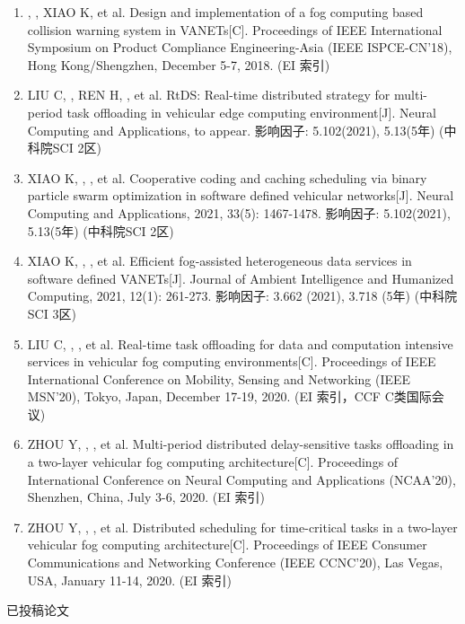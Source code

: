 \begin{enumerate}
	\item \textbf{}, , XIAO K, et al. Design and implementation of a fog computing based collision warning system in VANETs[C]. Proceedings of IEEE International Symposium on Product Compliance Engineering-Asia (IEEE ISPCE-CN’18), Hong Kong/Shengzhen, December 5-7, 2018. (EI 索引)
	\item LIU C, , REN H, \textbf{}, et al. RtDS: Real-time distributed strategy for multi-period task offloading in vehicular edge computing environment[J]. Neural Computing and Applications, to appear. 影响因子: 5.102(2021), 5.13(5年) (中科院SCI 2区)
	\item XIAO K, , \textbf{}, et al. Cooperative coding and caching scheduling via binary particle swarm optimization in software defined vehicular networks[J]. Neural Computing and Applications, 2021, 33(5): 1467-1478. 影响因子: 5.102(2021), 5.13(5年) (中科院SCI 2区)
	\item XIAO K, , \textbf{}, et al. Efficient fog-assisted heterogeneous data services in software defined VANETs[J]. Journal of Ambient Intelligence and Humanized Computing, 2021, 12(1): 261-273. 影响因子: 3.662 (2021), 3.718 (5年) (中科院SCI 3区)
	\item LIU C, , \textbf{}, et al. Real-time task offloading for data and computation intensive services in vehicular fog computing environments[C]. Proceedings of IEEE International Conference on Mobility, Sensing and Networking (IEEE MSN’20), Tokyo, Japan, December 17-19, 2020. (EI 索引，CCF C类国际会议)
	\item ZHOU Y, , \textbf{ }, et al. Multi-period distributed delay-sensitive tasks offloading in a two-layer vehicular fog computing architecture[C]. Proceedings of International Conference on Neural Computing and Applications (NCAA’20), Shenzhen, China, July 3-6, 2020. (EI 索引)
	\item ZHOU Y, , \textbf{ }, et al. Distributed scheduling for time-critical tasks in a two-layer vehicular fog computing architecture[C]. Proceedings of IEEE Consumer Communications and Networking Conference (IEEE CCNC’20), Las Vegas, USA, January 11-14, 2020. (EI 索引)
\end{enumerate}

已投稿论文

